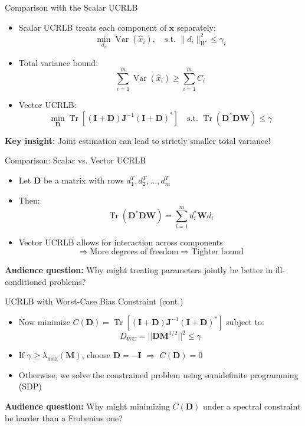 \documentclass{beamer}
\begin{document}
\begin{frame}{Comparison with the Scalar UCRLB}
\begin{itemize}
    \item Scalar UCRLB treats each component of $\mathbf{x}$ separately:
    \[
        \min_{d_i} \operatorname{Var}(\hat{x}_i), \quad \text{s.t. } \|d_i\|^2_W \leq \gamma_i
    \]
    \item Total variance bound:
    \[
        \sum_{i=1}^m \operatorname{Var}(\hat{x}_i) \geq \sum_{i=1}^m C_i
    \]
    \item Vector UCRLB:
    \[
        \min_{\mathbf{D}} \operatorname{Tr}[(\mathbf{I} + \mathbf{D}) \mathbf{J}^{-1} (\mathbf{I} + \mathbf{D})^*]
        \quad \text{s.t. } \operatorname{Tr}(\mathbf{D}^* \mathbf{D} \mathbf{W}) \leq \gamma
    \]
\end{itemize}
\pause
\textbf{Key insight:} Joint estimation can lead to strictly smaller total variance!
\end{frame}

\begin{frame}{Comparison: Scalar vs. Vector UCRLB}
\begin{itemize}
    \item Let $\mathbf{D}$ be a matrix with rows $d_1^T, d_2^T, \dots, d_m^T$
    \item Then:
    \[
        \operatorname{Tr}(\mathbf{D}^* \mathbf{D} \mathbf{W}) = \sum_{i=1}^m d_i^* \mathbf{W} d_i
    \]
    \item Vector UCRLB allows for interaction across components
    \[
        \Rightarrow \text{More degrees of freedom} \Rightarrow \text{Tighter bound}
    \]
\end{itemize}
\textbf{Audience question:} Why might treating parameters jointly be better in ill-conditioned problems?
\end{frame}


\begin{frame}{UCRLB with Worst-Case Bias Constraint (cont.)}
\begin{itemize}
    \item Now minimize $C(\mathbf{D}) = \operatorname{Tr}[(\mathbf{I} + \mathbf{D}) \mathbf{J}^{-1} (\mathbf{I} + \mathbf{D})^*]$ 
    subject to:
    \[
    D_{WC} = ||\mathbf{D} \mathbf{M}^{1/2}||^2 \leq \gamma
    \]
    \item If $\gamma \geq \lambda_{\max}(\mathbf{M})$, choose $\mathbf{D} = -\mathbf{I}$ $\Rightarrow$ $C(\mathbf{D}) = 0$
    \item Otherwise, we solve the constrained problem using semidefinite programming (SDP)
\end{itemize}
\vspace{0.3cm}
\textbf{Audience question:} Why might minimizing $C(\mathbf{D})$ under a spectral constraint be harder than a Frobenius one?
\end{frame}
\end{document}
